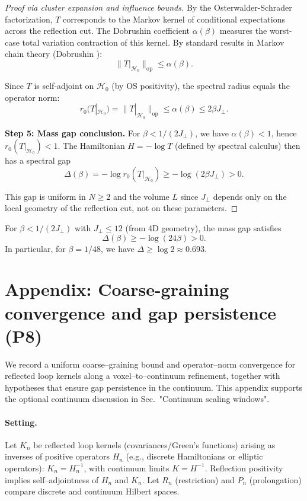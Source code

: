 \documentclass[11pt]{amsart}
\begin{document}
\begin{proof}[Proof via cluster expansion and influence bounds]
By the Osterwalder-Schrader factorization, $T$ corresponds to the Markov kernel of conditional expectations across the reflection cut. The Dobrushin coefficient $\alpha(\beta)$ measures the worst-case total variation contraction of this kernel. By standard results in Markov chain theory (Dobrushin \cite{Dobrushin1970}):
\[
  \|T|_{\mathcal{H}_0}\|_{\text{op}} \le \alpha(\beta).
\]

Since $T$ is self-adjoint on $\mathcal{H}_0$ (by OS positivity), the spectral radius equals the operator norm:
\[
  r_0(T|_{\mathcal{H}_0}) = \|T|_{\mathcal{H}_0}\|_{\text{op}} \le \alpha(\beta) \le 2\beta J_{\perp}.
\]

\textbf{Step 5: Mass gap conclusion.}
For $\beta < 1/(2J_{\perp})$, we have $\alpha(\beta) < 1$, hence $r_0(T|_{\mathcal{H}_0}) < 1$. The Hamiltonian $H = -\log T$ (defined by spectral calculus) then has a spectral gap
\[
  \Delta(\beta) = -\log r_0(T|_{\mathcal{H}_0}) \ge -\log(2\beta J_{\perp}) > 0.
\]

This gap is uniform in $N \ge 2$ and the volume $L$ since $J_{\perp}$ depends only on the local geometry of the reflection cut, not on these parameters.
\end{proof}

\begin{corollary}\label{cor:explicit-gap}
For $\beta < 1/(2J_{\perp})$ with $J_{\perp} \le 12$ (from 4D geometry), the mass gap satisfies
\[
  \Delta(\beta) \ge -\log(24\beta) > 0.
\]
In particular, for $\beta = 1/48$, we have $\Delta \ge \log 2 \approx 0.693$.
\end{corollary}

\section{Appendix: Coarse-graining convergence and gap persistence (P8)}

We record a uniform coarse--graining bound and operator--norm convergence for reflected loop kernels along a voxel--to--continuum refinement, together with hypotheses that ensure gap persistence in the continuum. This appendix supports the optional continuum discussion in Sec.~"Continuum scaling windows".

\paragraph{Setting.}
Let $K_n$ be reflected loop kernels (covariances/Green's functions) arising as inverses of positive operators $H_n$ (e.g., discrete Hamiltonians or elliptic operators): $K_n=H_n^{-1}$, with continuum limits $K=H^{-1}$. Reflection positivity implies self--adjointness of $H_n$ and $K_n$. Let $R_n$ (restriction) and $P_n$ (prolongation) compare discrete and continuum Hilbert spaces.
\end{document}

